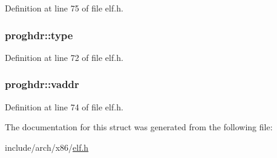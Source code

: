 \-Definition at line 75 of file elf.\-h.

\hypertarget{structproghdr_a523c83d0b884fb303b4b079e86a6aa55}{
\subsubsection[{type}]{ {\bf proghdr\-::type}}}\label{structproghdr_a523c83d0b884fb303b4b079e86a6aa55}


\-Definition at line 72 of file elf.\-h.

\hypertarget{structproghdr_ac7edbebc9b5120c39b49301851765c42}{
\subsubsection[{vaddr}]{ {\bf proghdr\-::vaddr}}}\label{structproghdr_ac7edbebc9b5120c39b49301851765c42}


\-Definition at line 74 of file elf.\-h.



\-The documentation for this struct was generated from the following file\-:\begin{DoxyCompactItemize}
\item 
include/arch/x86/\hyperlink{elf_8h}{elf.\-h}\end{DoxyCompactItemize}
